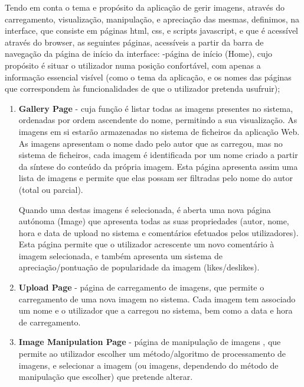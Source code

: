\documentclass{report}
\begin{document}
	Tendo em conta o tema e propósito da aplicação de gerir imagens, através do carregamento, visualização, manipulação, e apreciação das mesmas, definimos, na interface, que consiste em páginas html, css, e scripts javascript, e que é acessível através do browser, as seguintes páginas, acessíveis a partir da barra de navegação da página de início da interface:
-página de início (Home), cujo propósito é situar o utilizador numa posição confortável, com apenas a informação essencial visível (como o tema da aplicação, e os nomes das páginas que correspondem às funcionalidades de que o utilizador pretenda usufruir);

\begin{enumerate}
    \item \textbf{Gallery Page}
    - cuja função é listar todas as imagens presentes no sistema, ordenadas por ordem ascendente do nome, permitindo a sua visualização. As imagens em si estarão armazenadas no sistema de ficheiros da aplicação Web. As imagens apresentam o nome dado pelo autor que as carregou, mas no sistema de ficheiros, cada imagem é identificada por um nome criado a partir da síntese do conteúdo da própria imagem. Esta página apresenta assim uma lista de imagens e permite que elas possam ser filtradas pelo nome do autor (total ou parcial).
    
\linebreak

 Quando uma destas imagens é selecionada, é aberta uma nova página autónoma (Image) que apresenta todas as suas propriedades (autor, nome, hora e data de upload no sistema e comentários efetuados pelos utilizadores). Esta página permite que o utilizador acrescente um novo comentário à imagem selecionada, e também apresenta um sistema de apreciação/pontuação de popularidade da imagem (likes/deslikes).

 \linebreak
\bigskip

    \item \textbf{Upload Page}
    - página de carregamento de imagens, que permite o carregamento de uma nova imagem no sistema. Cada imagem tem associado um nome e o utilizador que a carregou no sistema, bem como a data e hora de carregamento.

    \newpage

    \item \textbf{Image Manipulation Page}
    - página de manipulação de imagens , que permite ao utilizador escolher um método/algoritmo de processamento de imagens, e selecionar a imagem (ou imagens, dependendo do método de manipulação que escolher) que pretende alterar.
\linebreak
  

\end{enumerate}
\end{document}
